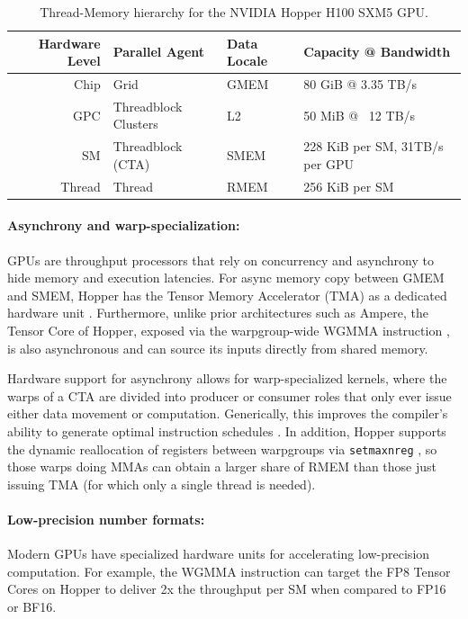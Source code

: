 \begin{table}[h!]
  \small
  \centering
  \caption{Thread-Memory hierarchy for the NVIDIA Hopper H100 SXM5 GPU.}
  \label{tab:gpu-hierarchy}
  \begin{tabular}{|r|l|l|l|}
      \hline
      \textbf{Hardware Level} & \textbf{Parallel Agent} & \textbf{Data Locale} & \textbf{Capacity @ Bandwidth} \\
      \hline
      Chip   & Grid                 & GMEM & 80  GiB @ 3.35 TB/s \\
      GPC    & Threadblock Clusters & L2   & 50  MiB @ ~12 TB/s \\
      SM     & Threadblock (CTA)    & SMEM & 228 KiB per SM, 31TB/s per GPU \\
      Thread & Thread               & RMEM & 256 KiB per SM \\
      \hline
  \end{tabular}
\end{table}

\paragraph{Asynchrony and warp-specialization:}

GPUs are throughput processors that rely on concurrency and asynchrony to hide memory and execution latencies. For async memory copy between GMEM and SMEM, Hopper has the Tensor Memory Accelerator (TMA) as a dedicated hardware unit \cite[\S7.29]{cuda}.
Furthermore, unlike prior architectures such as Ampere, the Tensor Core of Hopper, exposed via the warpgroup-wide WGMMA instruction \cite[\S9.7.14]{ptx}, is also asynchronous and can source its inputs directly from shared memory.

Hardware support for asynchrony allows for warp-specialized kernels, where the warps of a CTA are divided into producer or consumer roles that only ever issue either data movement or computation. Generically, this improves the compiler's ability to generate optimal instruction schedules \citep{warp-specialization-2011}. In addition, Hopper supports the dynamic reallocation of registers between warpgroups via \verb|setmaxnreg| \cite[\S9.7.17.1]{ptx}, so those warps doing MMAs can obtain a larger share of RMEM than those just issuing TMA (for which only a single thread is needed).

\paragraph{Low-precision number formats:}
\label{sec:low-precision-gpu}
Modern GPUs have specialized hardware units for accelerating low-precision computation. For example, the WGMMA instruction can target the FP8 Tensor Cores on Hopper to deliver 2x the throughput per SM when compared to FP16 or BF16.

